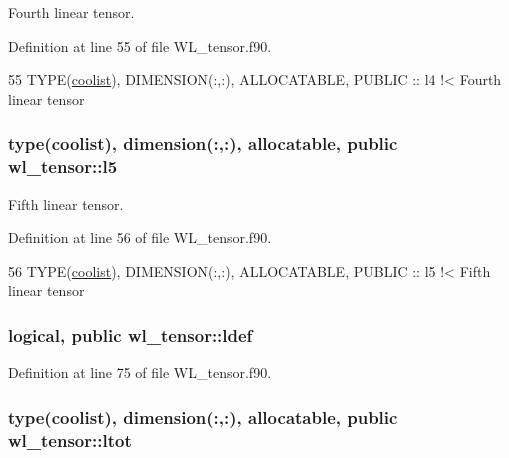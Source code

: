 Fourth linear tensor. 



Definition at line 55 of file W\+L\+\_\+tensor.\+f90.


\begin{DoxyCode}
55   \textcolor{keywordtype}{TYPE}(\hyperlink{structtensor_1_1coolist}{coolist}), \textcolor{keywordtype}{DIMENSION(:,:)}, \textcolor{keywordtype}{ALLOCATABLE}, \textcolor{keywordtype}{PUBLIC} :: l4\textcolor{comment}{    !< Fourth linear tensor}
\end{DoxyCode}
\subsubsection[{\texorpdfstring{l5}{l5}}]{\setlength{\rightskip}{0pt plus 5cm}type({\bf coolist}), dimension(\+:,\+:), allocatable, public wl\+\_\+tensor\+::l5}\hypertarget{namespacewl__tensor_a3205f1dbfef2da92755dbff79dbe05d5}{}\label{namespacewl__tensor_a3205f1dbfef2da92755dbff79dbe05d5}


Fifth linear tensor. 



Definition at line 56 of file W\+L\+\_\+tensor.\+f90.


\begin{DoxyCode}
56   \textcolor{keywordtype}{TYPE}(\hyperlink{structtensor_1_1coolist}{coolist}), \textcolor{keywordtype}{DIMENSION(:,:)}, \textcolor{keywordtype}{ALLOCATABLE}, \textcolor{keywordtype}{PUBLIC} :: l5\textcolor{comment}{    !< Fifth linear tensor}
\end{DoxyCode}
\subsubsection[{\texorpdfstring{ldef}{ldef}}]{\setlength{\rightskip}{0pt plus 5cm}logical, public wl\+\_\+tensor\+::ldef}\hypertarget{namespacewl__tensor_af8bcd8abccef10f4c6f0ef9d75fb6ab3}{}\label{namespacewl__tensor_af8bcd8abccef10f4c6f0ef9d75fb6ab3}


Definition at line 75 of file W\+L\+\_\+tensor.\+f90.

\subsubsection[{\texorpdfstring{ltot}{ltot}}]{\setlength{\rightskip}{0pt plus 5cm}type({\bf coolist}), dimension(\+:,\+:), allocatable, public wl\+\_\+tensor\+::ltot}\hypertarget{namespacewl__tensor_afd79a2a5beca62333d1b791582c848d1}{}\label{namespacewl__tensor_afd79a2a5beca62333d1b791582c848d1}


